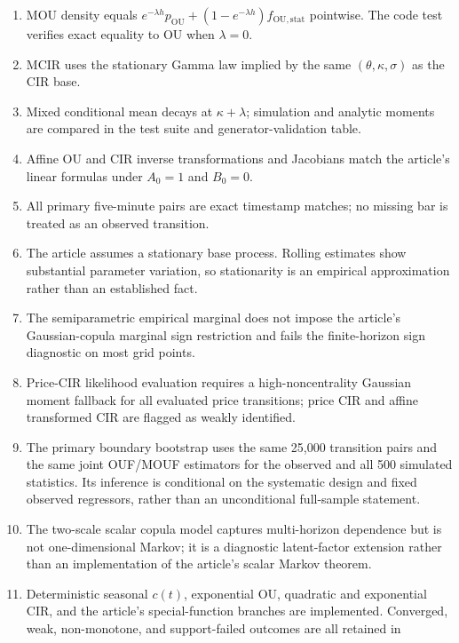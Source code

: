 \documentclass[11pt]{article}
\newcommand{\1}{\mathbf{1}}
\begin{document}
\begin{enumerate}
\item[\checkmark] MOU density equals
$e^{-\lambda h}p_{\mathrm{OU}}+(1-e^{-\lambda h})f_{\mathrm{OU,stat}}$ pointwise.
The code test verifies exact equality to OU when $\lambda=0$.
\item[\checkmark] MCIR uses the stationary Gamma law implied by the same
$(\theta,\kappa,\sigma)$ as the CIR base.
\item[\checkmark] Mixed conditional mean decays at $\kappa+\lambda$; simulation
and analytic moments are compared in the test suite and generator-validation
table.
\item[\checkmark] Affine OU and CIR inverse transformations and Jacobians match
the article's linear formulas under $A_0=1$ and $B_0=0$.
\item[\checkmark] All primary five-minute pairs are exact timestamp matches; no
missing bar is treated as an observed transition.
\item[$\triangle$] The article assumes a stationary base process.  Rolling
estimates show substantial parameter variation, so stationarity is an empirical
approximation rather than an established fact.
\item[$\triangle$] The semiparametric empirical marginal does not impose the
article's Gaussian-copula marginal sign restriction and fails the finite-horizon
sign diagnostic on most grid points.
\item[$\triangle$] Price-CIR likelihood evaluation requires a high-noncentrality
Gaussian moment fallback for all evaluated price transitions; price CIR and
affine transformed CIR are flagged as weakly identified.
\item[\checkmark] The primary boundary bootstrap uses the same 25,000 transition
pairs and the same joint OUF/MOUF estimators for the observed and all 500 simulated
statistics.  Its inference is conditional on the systematic design and fixed
observed regressors, rather than an unconditional full-sample statement.
\item[$\triangle$] The two-scale scalar copula model captures multi-horizon
dependence but is not one-dimensional Markov; it is a diagnostic latent-factor
extension rather than an implementation of the article's scalar Markov theorem.
\item[\checkmark] Deterministic seasonal $c(t)$, exponential OU, quadratic and
exponential CIR, and the article's special-function branches are implemented.
Converged, weak, non-monotone, and support-failed outcomes are all retained in

\end{enumerate}
\end{document}
